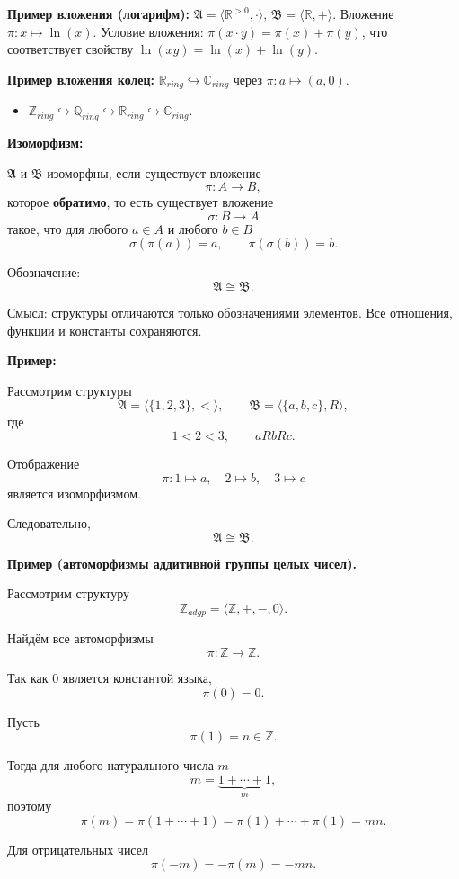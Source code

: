 \documentclass[12pt,a4paper,oneside,openany]{book}
\theoremstyle{definition}
\theoremstyle{plain}
\theoremstyle{remark}
\begin{document}
\textbf{Пример вложения (логарифм):}
$\mathfrak{A} = \langle \mathbb{R}^{>0}, \cdot \rangle$, $\mathfrak{B} = \langle \mathbb{R}, + \rangle$.
Вложение $\pi: x \mapsto \ln(x)$. Условие вложения: $\pi(x \cdot y) = \pi(x) + \pi(y)$, что соответствует свойству $\ln(xy) = \ln(x) + \ln(y)$.

\textbf{Пример вложения колец:}
$\mathbb{R}_{ring} \hookrightarrow \mathbb{C}_{ring}$ через $\pi: a \mapsto (a, 0)$.
\begin{itemize}
    \item  $\mathbb{Z}_{ring} \hookrightarrow \mathbb{Q}_{ring} \hookrightarrow \mathbb{R}_{ring} \hookrightarrow \mathbb{C}_{ring}$.
\end{itemize}


\textbf{Изоморфизм:}

$\mathfrak{A}$ и $\mathfrak{B}$ изоморфны, если существует вложение
\[
\pi:A\to B,
\]
которое \textbf{обратимо}, то есть существует вложение
\[
\sigma:B\to A
\]
такое, что для любого $a\in A$ и любого $b\in B$
\[
\sigma(\pi(a))=a,
\qquad
\pi(\sigma(b))=b.
\]

Обозначение:
\[
\mathfrak{A}\cong\mathfrak{B}.
\]

Смысл: структуры отличаются только обозначениями элементов. Все отношения, функции и константы сохраняются.

\textbf{Пример:}

Рассмотрим структуры
\[
\mathfrak{A}=\langle \{1,2,3\},< \rangle,
\qquad
\mathfrak{B}=\langle \{a,b,c\},R \rangle,
\]
где
\[
1<2<3,
\qquad
aRbRc.
\]

Отображение
\[
\pi:1\mapsto a,\quad 2\mapsto b,\quad 3\mapsto c
\]
является изоморфизмом.

Следовательно,
\[
\mathfrak{A}\cong\mathfrak{B}.
\]

\textbf{Пример (автоморфизмы аддитивной группы целых чисел).}

Рассмотрим структуру
\[
\mathbb{Z}_{adgp}=\langle \mathbb{Z},+,-,0\rangle.
\]

Найдём все автоморфизмы
\[
\pi:\mathbb{Z}\to\mathbb{Z}.
\]

Так как $0$ является константой языка,
\[
\pi(0)=0.
\]

Пусть
\[
\pi(1)=n\in\mathbb{Z}.
\]

Тогда для любого натурального числа $m$
\[
m=\underbrace{1+\cdots+1}_{m},
\]
поэтому
\[
\pi(m)
=
\pi(1+\cdots+1)
=
\pi(1)+\cdots+\pi(1)
=
mn.
\]

Для отрицательных чисел
\[
\pi(-m)
=
-\pi(m)
=
-mn.
\]
\end{document}
